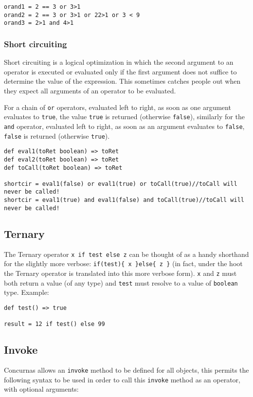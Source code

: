 \documentclass[conc-doc]{subfiles}
\begin{document}
\begin{lstlisting}
orand1 = 2 == 3 or 3>1
orand2 = 2 == 3 or 3>1 or 22>1 or 3 < 9
orand3 = 2>1 and 4>1
\end{lstlisting}

\subsubsection{Short circuiting}
Short circuiting is a logical optimization in which the second argument to an operator is executed or evaluated only if the first argument does not suffice to determine the value of the expression. This sometimes catches people out when they expect all arguments of an operator to be evaluated.

For a chain of \lstinline{or} operators, evaluated left to right, as soon as one argument evaluates to \lstinline{true}, the value \lstinline{true} is returned (otherwise \lstinline{false}), similarly for the \lstinline{and} operator, evaluated left to right, as soon as an argument evaluates to \lstinline{false}, \lstinline{false} is returned (otherwise \lstinline{true}).

\begin{lstlisting}
def eval1(toRet boolean) => toRet
def eval2(toRet boolean) => toRet
def toCall(toRet boolean) => toRet

shortcir = eval1(false) or eval1(true) or toCall(true)//toCall will never be called!
shortcir = eval1(true) and eval1(false) and toCall(true)//toCall will never be called!
\end{lstlisting}

\subsection{Ternary}
The Ternary operator \lstinline{x if test else z} can be thought of as a handy shorthand for the slightly more verbose: \lstinline!if(test){ x }else{ z }! (in fact, under the hoot the Ternary operator is translated into this more verbose form). \lstinline{x} and \lstinline{z} must both return a value (of any type) and \lstinline{test} must resolve to a value of \lstinline{boolean} type. Example:

\begin{lstlisting}
def test() => true

result = 12 if test() else 99
\end{lstlisting}

\subsection{Invoke}
Concurnas allows an \lstinline{invoke} method to be defined for all objects, this permits the following syntax to be used in order to call this \lstinline{invoke} method as an operator, with optional arguments:
\end{document}
